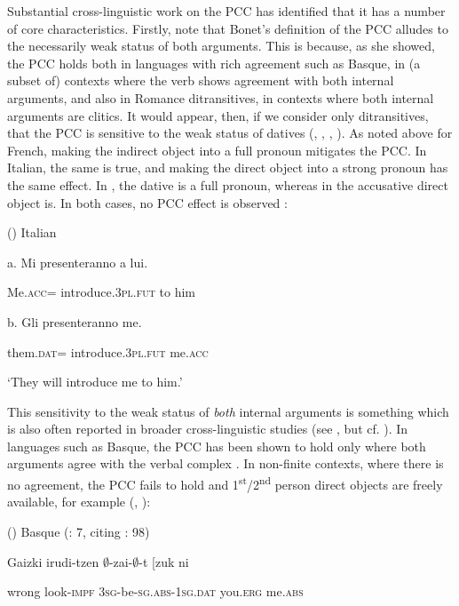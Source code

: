 \documentclass[output=paper,modfonts,nonflat]{langsci/langscibook}
\begin{document}
Substantial cross-linguistic work on the PCC has identified that it has a number of core characteristics. Firstly, note that Bonet’s definition of the PCC alludes to the necessarily weak status of both arguments. This is because, as she showed, the PCC holds both in languages with rich agreement such as Basque, in (a subset of) contexts where the verb shows agreement with both internal arguments, and also in Romance ditransitives, in contexts where both internal arguments are clitics. It would appear, then, if we consider only ditransitives, that the PCC is sensitive to the weak status of datives (\citealt{Bonet1991}, \citealt{Anagnostopoulou2005}, \citealt{Bianchi2006}, \citealt{Stegovec2017}). As noted above for French, making the indirect object into a full pronoun mitigates the PCC. In Italian, the same is true, and making the direct object into a strong pronoun has the same effect. In , the dative is a full pronoun, whereas in  the accusative direct object is. In both cases, no PCC effect is observed \citep{Bianchi2006}:

()  Italian \citep[2041]{Bianchi2006}

  a.  Mi   presenteranno       a  lui.

    Me.\textsc{acc}=  introduce.\textsc{3pl}.\textsc{fut}   to   him

  b.  Gli     presenteranno       me.

    them.\textsc{dat=}   introduce.\textsc{3pl}.\textsc{fut}     me.\textsc{acc}

    ‘They will introduce me to him.’

This sensitivity to the weak status of \textit{both} internal arguments is something which is also often reported in broader cross-linguistic studies (see \citealt{Stegovec2017}, but cf. \citealt{OrmazabalRomero2007}). In languages such as Basque, the PCC has been shown to hold only where both arguments agree with the verbal complex \citep{Laka1996}. In non-finite contexts, where there is no agreement, the PCC fails to hold and 1\textsuperscript{st}/2\textsuperscript{nd} person direct objects are freely available, for example (\citealt{Laka1996}, \citealt{Preminger2019}): 

()  Basque (\citealt{Preminger2019}: 7, citing \citealt{Laka1996}: 98)

  Gaizki   irudi-tzen   ${\emptyset}$-zai-${\emptyset}$-t    [zuk           ni      

  wrong   look-\textsc{impf}   \textsc{3sg}{}-be-\textsc{sg}.\textsc{abs}{}-\textsc{1sg}.\textsc{dat}  you.\textsc{erg}    me.\textsc{abs}
\end{document}
